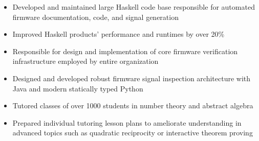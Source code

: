 \documentclass[10pt,a4paper]{altacv}
\newenvironment{tightitemize} %
{\vspace{-\topsep}\begin{itemize}\itemsep1pt \parskip0pt \parsep0pt}
{\end{itemize}\vspace{-\topsep}}
\begin{document}
\smallskip
\divider


\vspace{\topsep} %
\begin{tightitemize}
\item Developed and maintained large Haskell code base responsible for automated firmware 
    documentation, code, and signal generation
\item Improved Haskell products' performance and runtimes by over 20\%
\item Responsible for design and implementation of core firmware
    verification infrastructure employed by entire organization
\item Designed and developed robust firmware signal inspection architecture with 
    Java and modern statically typed Python
\end{tightitemize}

\smallskip
\divider

\vspace{\topsep} %
\begin{tightitemize}
\item Tutored classes of over 1000 students in number theory and abstract algebra
\item Prepared individual tutoring lesson plans to ameliorate 
    understanding in advanced topics such as quadratic reciprocity or 
    interactive theorem proving
\end{tightitemize}

\smallskip
\divider
\end{document}
